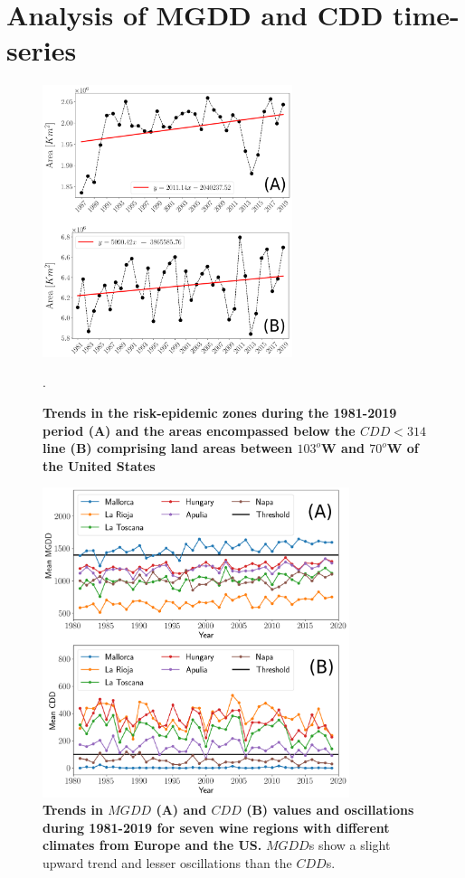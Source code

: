 \section{Analysis of MGDD and CDD time-series}

\begin{figure}[H]
    \centering
    \includegraphics[width=0.65\textwidth]{Figures/CDD_risk_evol_USA.png}
    \caption{\textbf{Trends in the risk-epidemic zones during the 1981-2019
            period (A) and the areas encompassed below the $CDD < 314$ line (B)
            comprising
            land areas between $103^o$W and $70^o$W of the United States}}.
    \label{fig:sup_CDD_evol} %
\end{figure}

\begin{figure}[H]
    \centering
    \includegraphics[width=0.8\textwidth]{Figures/Mean_MGDD_CDD_sites.png}
    \caption{\textbf{Trends in $MGDD$ (A) and $CDD$ (B) values and
            oscillations during 1981-2019 for seven wine regions with different
            climates
            from Europe and the US.} $MGDD$s show a slight upward trend and
        lesser
        oscillations than the $CDD$s.}
    \label{fig:sup_climatic_oscilations} %
\end{figure}

